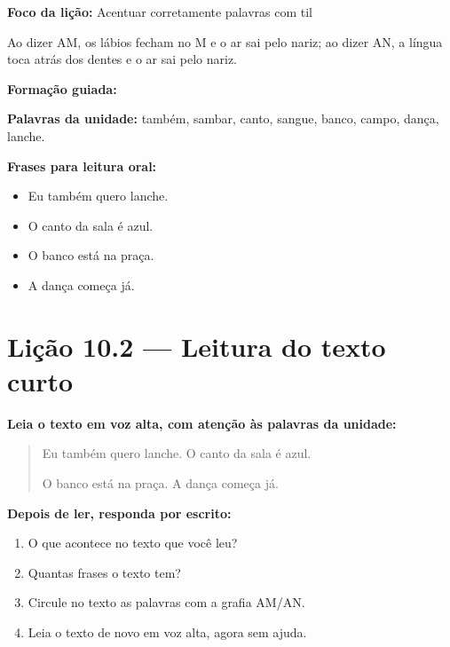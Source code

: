 \textbf{Foco da lição:} Acentuar corretamente palavras com til


\begin{boquinha}
Ao dizer AM, os lábios fecham no M e o ar sai pelo nariz; ao dizer AN, a língua toca atrás dos dentes e o ar sai pelo nariz.
\end{boquinha}

\noindent\textbf{Formação guiada:}

\begin{center}
\end{center}

\noindent\textbf{Palavras da unidade:} também, sambar, canto, sangue, banco, campo, dança, lanche.

\noindent\textbf{Frases para leitura oral:}
\begin{itemize}[leftmargin=1.6em]
  \item Eu também quero lanche.
  \item O canto da sala é azul.
  \item O banco está na praça.
  \item A dança começa já.
\end{itemize}

\section{Lição 10.2 --- Leitura do texto curto}

\noindent\textbf{Leia o texto em voz alta, com atenção às palavras da unidade:}


\begin{quote}
Eu também quero lanche. O canto da sala é azul.

O banco está na praça. A dança começa já.
\end{quote}

\textbf{Depois de ler, responda por escrito:}
\begin{enumerate}

  \item O que acontece no texto que você leu?
  \begin{center}
  \underline{\hspace{12cm}}
  \end{center}

  \item Quantas frases o texto tem?
  \begin{center}
  \underline{\hspace{12cm}}
  \end{center}

  \item Circule no texto as palavras com a grafia AM/AN.

  \item Leia o texto de novo em voz alta, agora sem ajuda.

\end{enumerate}

